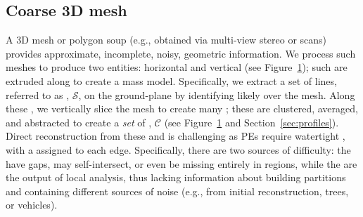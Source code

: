 \subsection{Coarse 3D mesh} 
A 3D mesh or polygon soup (e.g., obtained via multi-view stereo or \lidar scans) provides approximate, incomplete, noisy,  geometric information. 
We process such meshes to produce two entities: horizontal \emph{\sweepedges} and vertical \emph{\cleanprofiles} (see Figure~\ref{fig:terminology}); such \sweepedges are extruded along \cleanprofiles to create a mass model.
% 
Specifically, we extract a set of lines, referred to as \sweepedges, $\mathcal{S}$, on the ground-plane by identifying likely \facades over the mesh. 
Along these \sweepedges, we vertically slice the mesh to create many \emph{\rawprofiles}; these are clustered, averaged, and abstracted to create a \emph{set} of \emph{\cleanprofiles}, $\mathcal{C}$ (see Figure~\ref{fig:terminology} and Section~\ref{sec:profiles}).
%
Direct reconstruction from these \sweepedges and \cleanprofiles is challenging as PEs require watertight \footprintpolygons, with a \cleanprofile assigned to each edge. Specifically, there are two sources of difficulty: the \sweepedges have gaps, may self-intersect, or even be missing entirely in regions, while the \cleanprofiles are the output of local analysis, thus lacking information about building partitions and containing different sources of noise (e.g., from initial reconstruction, trees, or vehicles).

\begin{figure}[t]
    \centering
     \def\svgwidth{1\columnwidth}  
    
    \caption{}
    \label{fig:terminology}
\end{figure}


